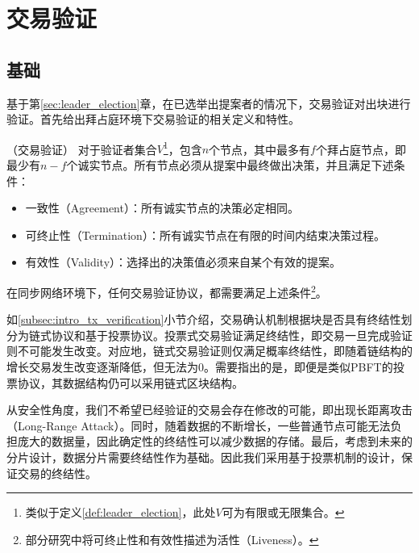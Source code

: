 \section{交易验证}
\subsection{基础}
基于第\ref{sec:leader_election}章，在已选举出提案者的情况下，交易验证对出块进行验证。首先给出拜占庭环境下交易验证的相关定义和特性。

\begin{definition}
（交易验证） 对于验证者集合$V$\footnote{类似于定义\ref{def:leader_election}，此处$V$可为有限或无限集合。}，包含$n$个节点，其中最多有$f$个拜占庭节点，即最少有$n-f$个诚实节点。所有节点必须从提案中最终做出决策，并且满足下述条件：
\begin{itemize}
	\item 一致性（Agreement）：所有诚实节点的决策必定相同。
	\item 可终止性（Termination）：所有诚实节点在有限的时间内结束决策过程。
	\item 有效性（Validity）：选择出的决策值必须来自某个有效的提案。
\end{itemize}
\end{definition}

在同步网络环境下，任何交易验证协议，都需要满足上述条件\footnote{部分研究中将可终止性和有效性描述为活性（Liveness）。}。%

如\ref{subsec:intro_tx_verification}小节介绍，交易确认机制根据块是否具有终结性划分为链式协议和基于投票协议。投票式交易验证满足终结性，即交易一旦完成验证则不可能发生改变。对应地，链式交易验证则仅满足概率终结性，即随着链结构的增长交易发生改变逐渐降低，但无法为$0$。需要指出的是，即便是类似PBFT的投票协议，其数据结构仍可以采用链式区块结构。

从安全性角度，我们不希望已经验证的交易会存在修改的可能，即出现长距离攻击（Long-Range Attack）。同时，随着数据的不断增长，一些普通节点可能无法负担庞大的数据量，因此确定性的终结性可以减少数据的存储。最后，考虑到未来的分片设计，数据分片需要终结性作为基础。因此我们采用基于投票机制的设计，保证交易的终结性。

